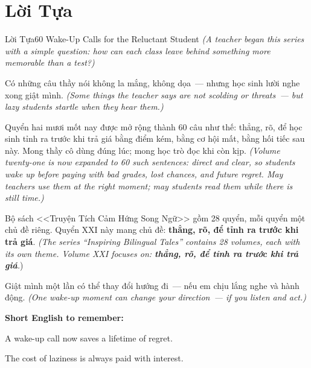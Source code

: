 \chapter*{Lời Tựa}

\begin{truyen}{Lời Tựa}{60 Wake-Up Calls for the Reluctant Student}
\textit{(A teacher began this series with a simple question: how can each class leave behind something more memorable than a test?)}

Có những câu thầy nói không la mắng, không dọa~--- nhưng học sinh lười nghe xong giật mình.
\textit{(Some things the teacher says are not scolding or threats~--- but lazy students startle when they hear them.)}

Quyển hai mươi mốt nay được mở rộng thành 60 câu như thế: thẳng, rõ, để học sinh tỉnh ra trước khi trả giá bằng điểm kém, bằng cơ hội mất, bằng hối tiếc sau này. Mong thầy cô dùng đúng lúc; mong học trò đọc khi còn kịp.
\textit{(Volume twenty-one is now expanded to 60 such sentences: direct and clear, so students wake up before paying with bad grades, lost chances, and future regret. May teachers use them at the right moment; may students read them while there is still time.)}

Bộ sách <<Truyện Tích Cảm Hứng Song Ngữ>> gồm 28 quyển, mỗi quyển một chủ đề riêng. Quyển XXI này mang chủ đề: \textbf{thẳng, rõ, để tỉnh ra trước khi trả giá}.
\textit{(The series ``Inspiring Bilingual Tales'' contains 28 volumes, each with its own theme. Volume XXI focuses on: \textbf{thẳng, rõ, để tỉnh ra trước khi trả giá}.})
\end{truyen}

\begin{baihoc}
Giật mình một lần có thể thay đổi hướng đi~--- nếu em chịu lắng nghe và hành động.
\textit{(One wake-up moment can change your direction~--- if you listen and act.)}
\end{baihoc}

\begin{ghinhoanh}
\textbf{Short English to remember:}

A wake-up call now saves a lifetime of regret.

The cost of laziness is always paid with interest.
\end{ghinhoanh}

